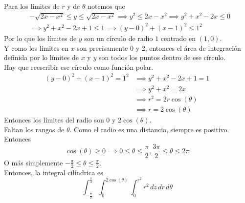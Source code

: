 \documentclass{article}
\begin{document}
\begin{enumerate}
{            Para los límites de $r$ y de $\theta$ notemos que
            \begin{align*}
                &-\sqrt{2x-x^2} \leq y \leq \sqrt{2x-x^2}
                \implies y^2 \leq 2x-x^2 \implies y^2 + x^2 - 2x \leq 0\\
                &\implies y^2 + x^2 - 2x + 1 \leq 1
                \implies (y - 0)^2 + (x - 1)^2 \leq 1^2
            \end{align*}
            Por lo que los límites de $y$ son un círculo de radio $1$ centrado
            en $(1, 0)$.\\
            Y como los límites en $x$ son precisamente 0 y 2, entonces el área
            de integración definida por lo límites de $x$ y $y$ son todos los
            puntos dentro de ese círculo.\\
            Hay que reescribir ese círculo como función polar.
            \begin{align*}
                (y-0)^2+(x-1)^2=1^2
                &\implies y^2+x^2-2x+1 = 1\\
                &\implies y^2+x^2 = 2x\\
                &\implies r^2 = 2r\cos(\theta)\\
                &\implies r = 2\cos(\theta)
            \end{align*}
            Entonces los límites del radio son 0 y $2\cos(\theta)$.\\
            Faltan los rangos de $\theta$. Como el radio es una distancia,
            siempre es positivo. Entonces
            \[
                \cos(\theta) \geq 0 \implies 0 \leq \theta \leq \frac{\pi}{2},
                \frac{3\pi}{2} \leq \theta \leq 2 \pi
            \]
            O más simplemente $-\frac{\pi}{2} \leq \theta \leq \frac{\pi}{2}$.\\
            Entonces, la integral cilíndrica es
            \[
                \int_{-\frac{\pi}{2}}^{\frac{\pi}{2}}{
                    \int_{0}^{2\cos(\theta)}{
                        \int_{0}^{r^2}{
                            r^2
                        \,dz}
                    \,dr}
                \,d\theta}
            \]

}
\end{enumerate}
\end{document}

